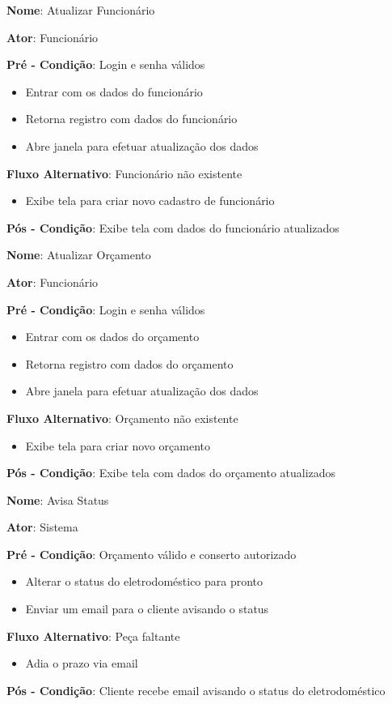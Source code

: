 \documentclass[a4paper,10pt]{article}
\begin{document}
\begin{framed}
\textbf{Nome}: Atualizar Funcionário

\textbf{Ator}: Funcionário

\textbf{Pré - Condição}: Login e senha válidos
\begin{itemize}
\item Entrar com os dados do funcionário
\item Retorna registro com dados do funcionário
\item Abre  janela para efetuar atualização dos dados
\end{itemize}
\textbf{Fluxo Alternativo}: Funcionário não existente
\begin{itemize}
\item Exibe  tela para criar novo cadastro de funcionário
\end{itemize}
\textbf{Pós - Condição}: Exibe tela com dados do funcionário atualizados
\end{framed}

\begin{framed}
\textbf{Nome}: Atualizar Orçamento

\textbf{Ator}: Funcionário

\textbf{Pré - Condição}: Login e senha válidos
\begin{itemize}
\item Entrar com os dados do orçamento
\item Retorna registro com dados do orçamento
\item Abre  janela para efetuar atualização dos dados
\end{itemize}
\textbf{Fluxo Alternativo}: Orçamento não existente
\begin{itemize}
\item Exibe  tela para criar novo orçamento
\end{itemize}
\textbf{Pós - Condição}: Exibe tela com dados do orçamento atualizados
 
\end{framed}

\begin{framed}
\textbf{Nome}: Avisa Status 

\textbf{Ator}: Sistema

\textbf{Pré - Condição}: Orçamento válido e conserto autorizado
\begin{itemize}
\item Alterar o status do eletrodoméstico para pronto
\item Enviar um email para o cliente avisando o status
\end{itemize}

\textbf{Fluxo Alternativo}: Peça faltante
\begin{itemize}
\item Adia o prazo via email
\end{itemize}

\textbf{Pós - Condição}: Cliente recebe email avisando o status do eletrodoméstico

\end{framed}
\end{document}
